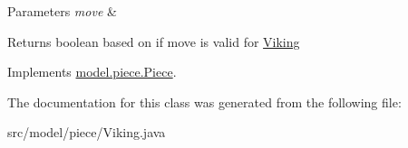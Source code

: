 \begin{DoxyParams}{Parameters}
{\em move} & \\
\hline
\end{DoxyParams}
\begin{DoxyReturn}{Returns}
boolean based on if move is valid for \hyperlink{classmodel_1_1piece_1_1_viking}{Viking} 
\end{DoxyReturn}


Implements \hyperlink{classmodel_1_1piece_1_1_piece_af7ce06755c9f20f3481796ca5b512849}{model.\-piece.\-Piece}.



The documentation for this class was generated from the following file\-:\begin{DoxyCompactItemize}
\item 
src/model/piece/Viking.\-java\end{DoxyCompactItemize}
